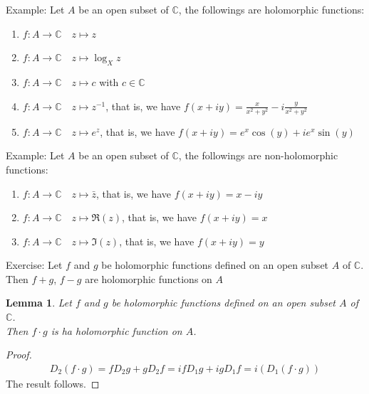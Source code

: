 \documentclass[15pt]{book}
\theoremstyle{break}
\theoremstyle{break}
\newtheorem{lem}{Lemma}[thm]
\newcommand{\Complex}{\mathbb{C}}
\newcommand{\example}{\color{green}Example: \color{black}}
\newcommand{\exercise}{\color{green}Exercise: \color{black}}
\begin{document}
\hfill\break

\example
Let $A$ be an open subset of $\Complex$, the followings are holomorphic functions:
\begin{enumerate}[topsep=3pt,itemsep=-1ex,partopsep=1ex,parsep=1ex]
\item $f:A \to \Complex  \quad z\mapsto z$
\item $f:A \to \Complex  \quad z\mapsto \log_X z$
\item $f:A \to \Complex  \quad z\mapsto c$ with $c \in \Complex$
\item $f:A \to \Complex  \quad z\mapsto z^{-1}$, that is, we have $f(x+iy) = \frac{x}{x^2 + y^2}-i\frac{y}{x^2 + y^2}$
\item $f:A \to \Complex  \quad z\mapsto e^z$, that is, we have $f(x+iy) = e^x \cos(y) + ie^x \sin(y)$
\end{enumerate}

\example
Let $A$ be an open subset of $\Complex$, the followings are non-holomorphic functions:
\begin{enumerate}[topsep=3pt,itemsep=-1ex,partopsep=1ex,parsep=1ex]
\item $f:A \to \Complex  \quad z\mapsto \bar{z}$, that is, we have $f(x+iy) = x-iy$
\item $f:A \to \Complex  \quad z\mapsto  \Re(z)$, that is, we have $f(x+iy) = x$
\item $f:A \to \Complex  \quad z\mapsto  \Im(z)$, that is, we have $f(x+iy) = y$\\
\end{enumerate}

\exercise Let $f$ and $g$ be holomorphic functions defined on an open subset $A$ of $\Complex$. \\
Then $f+g$, $f-g$ are holomorphic functions on $A$\\

\hfill\break
\begin{lem}
Let $f$ and $g$ be holomorphic functions defined on an open subset $A$ of $\Complex$. \\
Then $f\cdot g$ is ha holomorphic function on $A$.
\end{lem}
\begin{proof}
\begin{align*}
D_2(f\cdot g) = fD_2 g + gD_2 f = ifD_1 g+ igD_1 f = i(D_1(f\cdot g))
\end{align*}
The result follows.
\end{proof}
\end{document}
